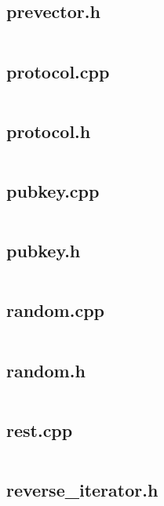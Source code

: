 \documentclass{article}
\begin{document}
\subsection{prevector.h}
\inputminted{cpp}{/home/dufferzafar/dev/@clones/bitcoin/src/prevector.h}
\newpage

\subsection{protocol.cpp}
\inputminted{cpp}{/home/dufferzafar/dev/@clones/bitcoin/src/protocol.cpp}
\newpage

\subsection{protocol.h}
\inputminted{cpp}{/home/dufferzafar/dev/@clones/bitcoin/src/protocol.h}
\newpage

\subsection{pubkey.cpp}
\inputminted{cpp}{/home/dufferzafar/dev/@clones/bitcoin/src/pubkey.cpp}
\newpage

\subsection{pubkey.h}
\inputminted{cpp}{/home/dufferzafar/dev/@clones/bitcoin/src/pubkey.h}
\newpage

\subsection{random.cpp}
\inputminted{cpp}{/home/dufferzafar/dev/@clones/bitcoin/src/random.cpp}
\newpage

\subsection{random.h}
\inputminted{cpp}{/home/dufferzafar/dev/@clones/bitcoin/src/random.h}
\newpage

\subsection{rest.cpp}
\inputminted{cpp}{/home/dufferzafar/dev/@clones/bitcoin/src/rest.cpp}
\newpage

\subsection{reverse\_iterator.h}
\inputminted{cpp}{/home/dufferzafar/dev/@clones/bitcoin/src/reverse_iterator.h}
\newpage
\end{document}

